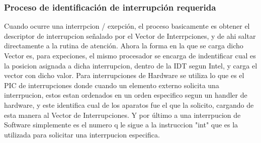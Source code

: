 \subsubsection*{Proceso de identificación de interrupción requerida}
\par{Cuando ocurre una interrpcion / exepción, el proceso basicamente es obtener el descriptor de interrupcion señalado por el Vector de Interrpciones, y de ahi saltar directamente a la rutina de atención. Ahora la forma en la que se carga dicho Vector es, para expeciones, el mismo procesador se encarga de indentificar cual es la posicion asignada a dicha interrupcion, dentro de la IDT segun Intel, y carga el vector con dicho valor.  Para interrupciones de Hardware se utiliza lo que es el PIC de interrupciones donde cuando un elemento externo solicita una interrpucion, estos estan ordenados en un orden especifico segun un handler de hardware, y este identifica cual de los aparatos fue el que la solicito, cargando de esta manera al Vector de Interrupciones. Y por último a una interrpucion de Software simplemente es el numero q le sigue a la instruccion "int" que es la utilizada para solicitar una interrpucion especifica.}

